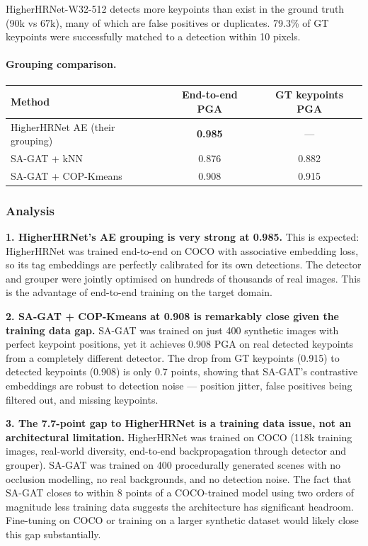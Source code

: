 \vspace{0.5em}

HigherHRNet-W32-512 detects more keypoints than exist in the ground truth (90k vs 67k), many of which are false positives or duplicates. 79.3\% of GT keypoints were successfully matched to a detection within 10 pixels.

\paragraph{Grouping comparison.}

\begin{tabular}{lcc}
\hline
\textbf{Method} & \textbf{End-to-end PGA} & \textbf{GT keypoints PGA} \\
\hline
HigherHRNet AE (their grouping) & \textbf{0.985} & --- \\
SA-GAT + kNN & 0.876 & 0.882 \\
SA-GAT + COP-Kmeans & 0.908 & 0.915 \\
\hline
\end{tabular}

\subsubsection{Analysis}

\textbf{1. HigherHRNet's AE grouping is very strong at 0.985.} This is expected: HigherHRNet was trained end-to-end on COCO with associative embedding loss, so its tag embeddings are perfectly calibrated for its own detections. The detector and grouper were jointly optimised on hundreds of thousands of real images. This is the advantage of end-to-end training on the target domain.

\textbf{2. SA-GAT + COP-Kmeans at 0.908 is remarkably close given the training data gap.} SA-GAT was trained on just 400 synthetic images with perfect keypoint positions, yet it achieves 0.908 PGA on real detected keypoints from a completely different detector. The drop from GT keypoints (0.915) to detected keypoints (0.908) is only 0.7 points, showing that SA-GAT's contrastive embeddings are robust to detection noise --- position jitter, false positives being filtered out, and missing keypoints.

\textbf{3. The 7.7-point gap to HigherHRNet is a training data issue, not an architectural limitation.} HigherHRNet was trained on COCO (118k training images, real-world diversity, end-to-end backpropagation through detector and grouper). SA-GAT was trained on 400 procedurally generated scenes with no occlusion modelling, no real backgrounds, and no detection noise. The fact that SA-GAT closes to within 8 points of a COCO-trained model using two orders of magnitude less training data suggests the architecture has significant headroom. Fine-tuning on COCO or training on a larger synthetic dataset would likely close this gap substantially.

